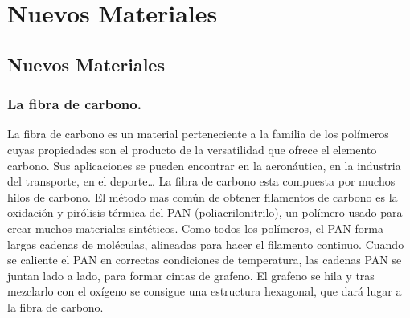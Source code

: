\documentclass[../main]{subfiles}
\begin{document}
\chapter{Nuevos Materiales}

\section{Nuevos Materiales}

\subsection{La fibra de carbono.}

La fibra de carbono es un material perteneciente a la familia de los
polímeros cuyas propiedades son el producto de la versatilidad que
ofrece el elemento carbono. Sus aplicaciones se pueden encontrar en
la aeronáutica, en la industria del transporte, en el deporte…
La fibra de carbono esta compuesta por muchos hilos de carbono. El
método mas común de obtener filamentos de carbono es la oxidación y
pirólisis térmica del PAN (poliacrilonitrilo), un polímero usado para
crear muchos materiales sintéticos. Como todos los polímeros, el PAN
forma largas cadenas de moléculas, alineadas para hacer el filamento
continuo. Cuando se caliente el PAN en correctas condiciones de
temperatura, las cadenas PAN se juntan lado a lado, para formar
cintas de grafeno. El grafeno se hila y tras mezclarlo con el oxígeno
se consigue una estructura hexagonal, que dará lugar a la fibra de carbono.
\end{document}
